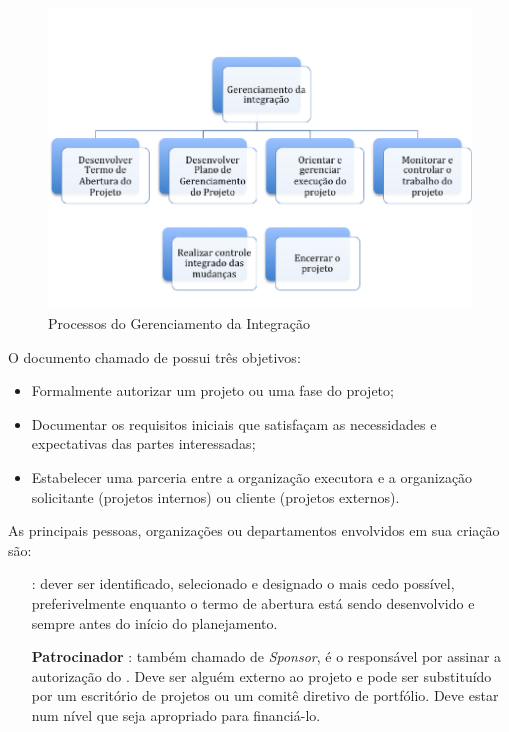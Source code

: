 \begin{figure}[!h]
\centering
\includegraphics[scale=0.75]{Figuras/gerenciamento_integracao.png}
\caption{Processos do Gerenciamento da Integração}
\label{fig:proc:ger:integr}
\end{figure}


O documento chamado de \termo possui três objetivos:

\begin{itemize}
	
	\item Formalmente autorizar um projeto ou uma fase do projeto;
	
	\item Documentar os requisitos iniciais que satisfaçam as necessidades e expectativas das partes interessadas;
	
	\item Estabelecer uma parceria entre a organização executora e a organização solicitante (projetos internos) ou cliente (projetos externos).
	
\end{itemize}

As principais pessoas, organizações ou departamentos envolvidos em sua criação são:

\begin{itemize}
	
	\item[\textbf{\gp}]: dever ser identificado, selecionado e designado o mais cedo possível, preferivelmente enquanto o termo de abertura está sendo desenvolvido e sempre antes do início do planejamento.
	
	\item[\textbf{Patrocinador}]: também chamado de \textit{Sponsor}, é o responsável por assinar a autorização do \termo. Deve ser alguém externo ao projeto e pode ser substituído por um escritório de projetos ou um comitê diretivo de portfólio. Deve estar num nível que seja apropriado para financiá-lo. 
	
\end{itemize}

